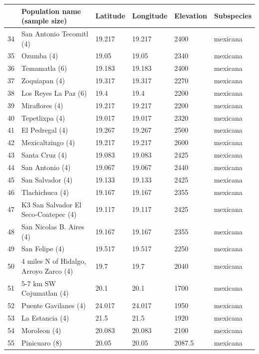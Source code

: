 \begin{table}
\begin{center}
\tiny{
    \begin{tabular}{r@{--}lllll}
  \hline
  & Population name (sample size) & Latitude & Longitude & Elevation & Subspecies \\ 
  \hline
34 & San Antonio Tecomitl (4) & 19.217 & 19.217 & 2400 & mexicana \\ 
35 & Ozumba (4) & 19.05 & 19.05 & 2340 & mexicana \\ 
36 & Temamatla (6) & 19.183 & 19.183 & 2400 & mexicana \\ 
37 & Zoquiapan (4) & 19.317 & 19.317 & 2270 & mexicana \\ 
38 & Los Reyes La Paz (6) & 19.4 & 19.4 & 2200 & mexicana \\ 
39 & Miraflores (4) & 19.217 & 19.217 & 2200 & mexicana \\ 
40 & Tepetlixpa (4) & 19.017 & 19.017 & 2320 & mexicana \\ 
41 & El Pedregal (4) & 19.267 & 19.267 & 2500 & mexicana \\ 
42 & Mexicaltzingo (4) & 19.217 & 19.217 & 2600 & mexicana \\ 
43 & Santa Cruz (4) & 19.083 & 19.083 & 2425 & mexicana \\ 
44 & San Antonio (4) & 19.067 & 19.067 & 2440 & mexicana \\ 
45 & San Salvador (4) & 19.133 & 19.133 & 2425 & mexicana \\ 
46 & Tlachichuca (4) & 19.167 & 19.167 & 2355 & mexicana \\ 
47 & K3 San Salvador El Seco-Coatepec (4) & 19.117 & 19.117 & 2425 & mexicana \\ 
48 & San Nicolas B. Aires (4) & 19.167 & 19.167 & 2355 & mexicana \\ 
49 & San Felipe (4) & 19.517 & 19.517 & 2250 & mexicana \\ 
50 & 4 miles N of Hidalgo, Arroyo Zarco (4) & 19.7 & 19.7 & 2040 & mexicana \\ 
51 & 5-7 km SW Cojumatlan (4) & 20.1 & 20.1 & 1700 & mexicana \\ 
52 & Puente Gavilanes (4) & 24.017 & 24.017 & 1950 & mexicana \\ 
53 & La Estancia (4) & 21.5 & 21.5 & 1920 & mexicana \\ 
54 & Moroleon (4) & 20.083 & 20.083 & 2100 & mexicana \\ 
55 & Pinicuaro (8) & 20.05 & 20.05 & 2087.5 & mexicana \\ 

\end{tabular}}
\end{center}
\end{table}
